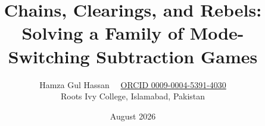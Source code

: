 %
\documentclass[11pt]{article}
\usepackage[margin=1.1in]{geometry}
\usepackage{amsmath,amssymb,amsthm}
\usepackage{enumitem}
\usepackage{alltt}   %
\emergencystretch=2em  %
\usepackage[colorlinks=true,linkcolor=blue,citecolor=blue,urlcolor=blue]{hyperref}

\newtheorem{theorem}{Theorem}[section]
\newtheorem{lemma}[theorem]{Lemma}
\newtheorem{proposition}[theorem]{Proposition}
\newtheorem{corollary}[theorem]{Corollary}
\theoremstyle{definition}
\newtheorem{definition}[theorem]{Definition}
\newtheorem{example}[theorem]{Example}
\theoremstyle{remark}
\newtheorem{remark}[theorem]{Remark}

\newcommand{\Q}{\mathcal{Q}}   %
\newcommand{\PP}{\ensuremath{\mathrm{P}}}
\newcommand{\NN}{\ensuremath{\mathrm{N}}}

\title{Chains, Clearings, and Rebels:\\ Solving a Family of
Mode-Switching Subtraction Games}
\author{Hamza Gul Hassan\ \ \small
\href{https://orcid.org/0009-0004-5391-4030}{ORCID 0009-0004-5391-4030}\\
Roots Ivy College, Islamabad, Pakistan}
\date{August 2026}


